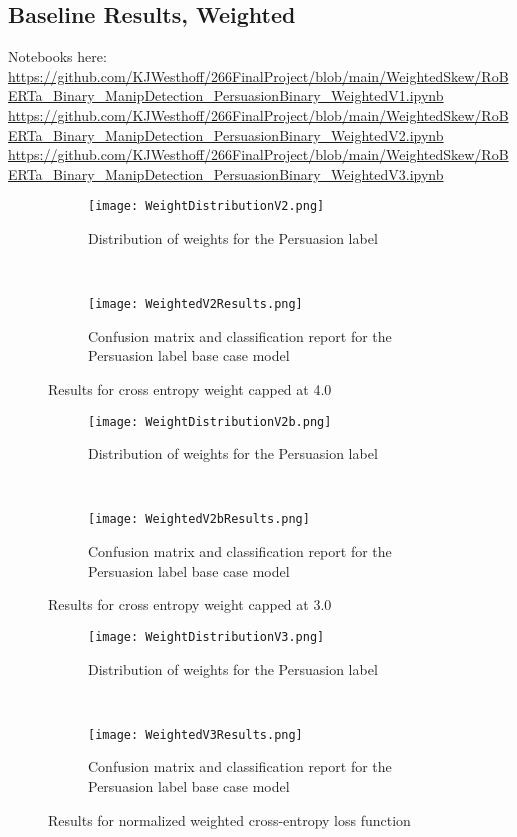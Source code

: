 \documentclass[
	letterpaper, %
	12pt, %
	unnumberedsections, %
	twoside, %
]{LTJournalArticle}
\begin{document}
\begin{appendices}
	\subsection{Baseline Results, Weighted}\label{appendix:WeightedResults}
	Notebooks here:
	\url{https://github.com/KJWesthoff/266FinalProject/blob/main/WeightedSkew/RoBERTa_Binary_ManipDetection_PersuasionBinary_WeightedV1.ipynb}
	\url{https://github.com/KJWesthoff/266FinalProject/blob/main/WeightedSkew/RoBERTa_Binary_ManipDetection_PersuasionBinary_WeightedV2.ipynb}
	\url{https://github.com/KJWesthoff/266FinalProject/blob/main/WeightedSkew/RoBERTa_Binary_ManipDetection_PersuasionBinary_WeightedV3.ipynb}


	\begin{figure*}[t!]
		\centering
		\begin{subfigure}[t]{0.5\textwidth}
			\centering
			\texttt{[image: WeightDistributionV2.png]}
			\caption{Distribution of weights for the Persuasion label}
			\label{fig:V2WeightDistribution}
		\end{subfigure}%
		~
		\begin{subfigure}[t]{0.5\textwidth}
			\texttt{[image: WeightedV2Results.png]}
			\caption{Confusion matrix and classification report for the Persuasion label base case model}
			\label{fig:V2Results}
			\centering
		\end{subfigure}
		\caption{Results for cross entropy weight capped at 4.0}
	\end{figure*}

	\begin{figure*}[t!]
		\centering
		\begin{subfigure}[t]{0.5\textwidth}
			\centering
			\texttt{[image: WeightDistributionV2b.png]}
			\caption{Distribution of weights for the Persuasion label}
			\label{fig:V2bWeightDistribution}
		\end{subfigure}%
		~
		\begin{subfigure}[t]{0.5\textwidth}
			\texttt{[image: WeightedV2bResults.png]}
			\caption{Confusion matrix and classification report for the Persuasion label base case model}
			\label{fig:V2bResults}
			\centering
		\end{subfigure}
		\caption{Results for cross entropy weight capped at 3.0}
	\end{figure*}


	\begin{figure*}[t!]
		\centering
		\begin{subfigure}[t]{0.5\textwidth}
			\centering
			\texttt{[image: WeightDistributionV3.png]}
			\caption{Distribution of weights for the Persuasion label}
			\label{fig:V3WeightDistribution}
		\end{subfigure}%
		~
		\begin{subfigure}[t]{0.5\textwidth}
			\texttt{[image: WeightedV3Results.png]}
			\caption{Confusion matrix and classification report for the Persuasion label base case model}
			\label{fig:V3Results}
			\centering
		\end{subfigure}
		\caption{Results for normalized weighted cross-entropy loss function}
	\end{figure*}
	\clearpage

\end{appendices}
\end{document}
